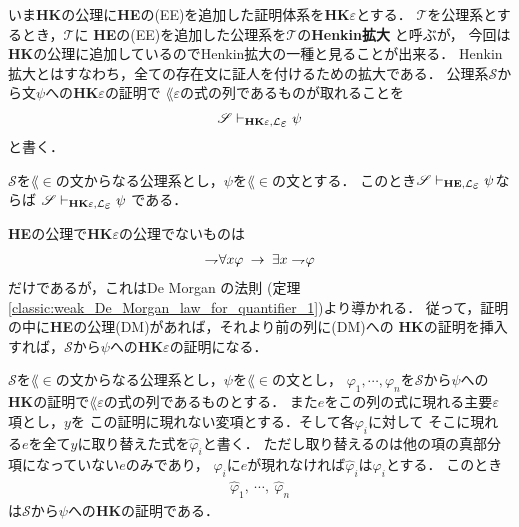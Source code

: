 	いま{\bf HK}の公理に{\bf HE}の(EE)を追加した証明体系を{\bf HK$\varepsilon$}とする．
	$\mathscr{T}$を公理系とするとき，$\mathscr{T}$に
	{\bf HE}の(EE)を追加した公理系を$\mathscr{T}$の{\bf Henkin拡大}
	と呼ぶが，
	今回は{\bf HK}の公理に追加しているのでHenkin拡大の一種と見ることが出来る．
	Henkin拡大とはすなわち，全ての存在文に証人を付けるための拡大である．
	公理系$\mathscr{S}$から文$\psi$への{\bf HK$\varepsilon$}の証明で
	$\lang{\varepsilon}$の式の列であるものが取れることを
	\begin{align}
		\mathscr{S} \provable{\mbox{{\bf HK}$\varepsilon$},\lang{\varepsilon}} \psi
	\end{align}
	と書く．
	
	\begin{screen}
		\begin{metathm}
		\label{metathm:Henkin_expansion_1}
			$\mathscr{S}$を$\lang{\in}$の文からなる公理系とし，$\psi$を$\lang{\in}$の文とする．
			このとき$\mathscr{S} \provable{\mbox{{\bf HE}},\lang{\varepsilon}} \psi$ならば
			$\mathscr{S} \provable{\mbox{{\bf HK}$\varepsilon$},\lang{\varepsilon}} \psi$
			である．
		\end{metathm}
	\end{screen}
	
	\begin{metaprf}
		{\bf HE}の公理で{\bf HK$\varepsilon$}の公理でないものは
		\begin{align}
			\rightharpoondown\hspace{-0.25em} \forall x \varphi \hspace{0.25em}\rightarrow\hspace{0.25em} \exists x \rightharpoondown\hspace{-0.25em} \varphi
		\end{align}
		だけであるが，これはDe Morgan の法則
		(定理\ref{classic:weak_De_Morgan_law_for_quantifier_1})より導かれる．
		従って，証明の中に{\bf HE}の公理(DM)があれば，それより前の列に(DM)への
		{\bf HK}の証明を挿入すれば，$\mathscr{S}$から$\psi$への{\bf HK$\varepsilon$}の証明になる．
		\QED
	\end{metaprf}
	
	\begin{screen}
		\begin{metathm}
		\label{metathm:Henkin_expansion_2_lemma}
			$\mathscr{S}$を$\lang{\in}$の文からなる公理系とし，$\psi$を$\lang{\in}$の文とし，
			$\varphi_{1},\cdots,\varphi_{n}$を$\mathscr{S}$から$\psi$への
			{\bf HK}の証明で$\lang{\varepsilon}$の式の列であるものとする．
			また$e$をこの列の式に現れる主要$\varepsilon$項とし，$y$を
			この証明に現れない変項とする．そして各$\varphi_{i}$に対して
			そこに現れる$e$を全て$y$に取り替えた式を$\hat{\varphi}_{i}$と書く．
			ただし取り替えるのは他の項の真部分項になっていない$e$のみであり，
			$\varphi_{i}$に$e$が現れなければ$\hat{\varphi}_{i}$は$\varphi_{i}$とする．
			このとき
			\begin{align}
				\hat{\varphi}_{1},\ \cdots,\ \hat{\varphi}_{n}
			\end{align}
			は$\mathscr{S}$から$\psi$への{\bf HK}の証明である．
		\end{metathm}
	\end{screen}
	
